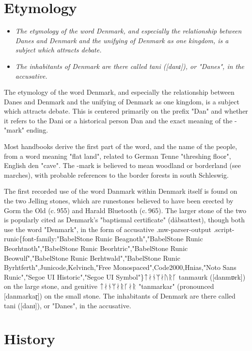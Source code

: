 \section{Etymology}\label{etymology}

\begin{itemize}
\item
  \emph{The etymology of the word Denmark, and especially the
  relationship between Danes and Denmark and the unifying of Denmark as
  one kingdom, is a subject which attracts debate.}
\item
  \emph{The inhabitants of Denmark are there called tani ({[}danɪ{]}),
  or "Danes", in the accusative.}
\end{itemize}

The etymology of the word Denmark, and especially the relationship
between Danes and Denmark and the unifying of Denmark as one kingdom, is
a subject which attracts debate. This is centered primarily on the
prefix "Dan" and whether it refers to the Dani or a historical person
Dan and the exact meaning of the -"mark" ending.

Most handbooks derive the first part of the word, and the name of the
people, from a word meaning "flat land", related to German Tenne
"threshing floor", English den "cave". The -mark is believed to mean
woodland or borderland (see marches), with probable references to the
border forests in south Schleswig.

The first recorded use of the word Danmark within Denmark itself is
found on the two Jelling stones, which are runestones believed to have
been erected by Gorm the Old (c. 955) and Harald Bluetooth (c. 965). The
larger stone of the two is popularly cited as Denmark's "baptismal
certificate" (dåbsattest), though both use the word "Denmark", in the
form of accusative .mw-parser-output
.script-runic\{font-family:"BabelStone Runic Beagnoth","BabelStone Runic
Beorhtnoth","BabelStone Runic Beorhtric","BabelStone Runic
Beowulf","BabelStone Runic Berhtwald","BabelStone Runic
Byrhtferth",Junicode,Kelvinch,"Free Monospaced",Code2000,Hnias,"Noto
Sans Runic","Segoe UI Historic","Segoe UI Symbol"\}ᛏᛅᚾᛘᛅᚢᚱᚴ tanmaurk
({[}danmɒrk{]}) on the large stone, and genitive ᛏᛅᚾᛘᛅᚱᚴᛅᚱ "tanmarkar"
(pronounced {[}danmarkaɽ{]}) on the small stone. The inhabitants of
Denmark are there called tani ({[}danɪ{]}), or "Danes", in the
accusative.

\section{History}\label{history}

